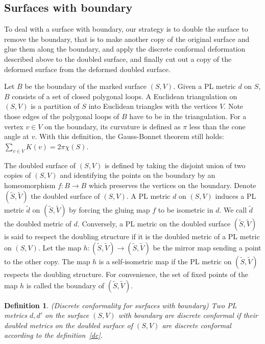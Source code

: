 \documentclass[11pt]{article}
\newtheorem{definition}[theorem]{Definition}
\begin{document}
\subsection{Surfaces with boundary}
\label{surfaceswithboundary}
To deal with a surface with boundary, our strategy is to double the surface to 
remove the boundary, that is to make another
copy of the original surface and glue them along the boundary, and apply 
the discrete conformal deformation described above to the doubled surface, and finally cut out
a copy of the deformed surface from the deformed doubled surface. 

Let $B$ be the boundary of the marked surface $(S, V)$. Given a PL metric $d$ on $S$, $B$ consists
of a set of closed polygonal loops. A Euclidean triangulation on $(S, V)$ is a partition of $S$ into 
Euclidean triangles with the vertices $V$. Note those edges of the polygonal loops of $B$ have to be 
in the triangulation. 
For a vertex $v\in V$ on the boundary, its curvature is defined as $\pi$ less than the cone angle at $v$. 
With this definition, the Gauss-Bonnet theorem still holds: $\sum_{v\in V} K(v) = 2\pi\chi(S)$. 

The doubled surface of $(S, V)$ is defined by taking the disjoint union of two 
copies of $(S, V)$ and identifying the points on the boundary by an homeomorphism 
$f: B\rightarrow B$ which preserves the vertices on the boundary. Denote $(\tilde{S}, \tilde{V})$ 
the doubled surface of $(S, V)$.  A PL metric $d$ on $(S, V)$ induces 
a PL metric $\tilde{d}$ on $(\tilde{S}, \tilde{V})$ by forcing the gluing map $f$ to 
be isometric in $d$. We call $\tilde{d}$ the doubled metric of $d$. 
Conversely, a PL metric on the doubled surface $(\tilde{S}, \tilde{V})$ is said 
to respect the doubling structure if it is the doubled metric of a PL metric on $(S, V)$. 
Let the map $h: (\tilde{S}, \tilde{V}) \rightarrow (\tilde{S}, \tilde{V}) $ be the 
mirror map sending a point to the other copy. The map $h$ is a self-isometric map if 
the PL metric on $(\tilde{S}, \tilde{V})$ respects the doubling structure. 
For convenience, the set of fixed points 
of the map $h$ is called the boundary of $(\tilde{S}, \tilde{V})$.


\begin{definition}
\label{dcwithboundary}(Discrete conformality for surfaces with boundary)
 Two PL metrics $d, {d}'$ on the surface $(S,V)$ with boundary are discrete conformal  if 
 their doubled metrics on the doubled surface of $(S, V)$ are discrete conformal according to the definition~\ref{dc}. 
\end{definition}
\end{document}
